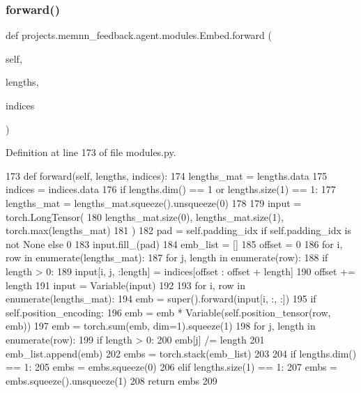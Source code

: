 \subsubsection{\texorpdfstring{forward()}{forward()}}
{\footnotesize\ttfamily def projects.\+memnn\+\_\+feedback.\+agent.\+modules.\+Embed.\+forward (\begin{DoxyParamCaption}\item[{}]{self,  }\item[{}]{lengths,  }\item[{}]{indices }\end{DoxyParamCaption})}



Definition at line 173 of file modules.\+py.


\begin{DoxyCode}
173     \textcolor{keyword}{def }forward(self, lengths, indices):
174         lengths\_mat = lengths.data
175         indices = indices.data
176         \textcolor{keywordflow}{if} lengths.dim() == 1 \textcolor{keywordflow}{or} lengths.size(1) == 1:
177             lengths\_mat = lengths\_mat.squeeze().unsqueeze(0)
178 
179         input = torch.LongTensor(
180             lengths\_mat.size(0), lengths\_mat.size(1), torch.max(lengths\_mat)
181         )
182         pad = self.padding\_idx \textcolor{keywordflow}{if} self.padding\_idx \textcolor{keywordflow}{is} \textcolor{keywordflow}{not} \textcolor{keywordtype}{None} \textcolor{keywordflow}{else} 0
183         input.fill\_(pad)
184         emb\_list = []
185         offset = 0
186         \textcolor{keywordflow}{for} i, row \textcolor{keywordflow}{in} enumerate(lengths\_mat):
187             \textcolor{keywordflow}{for} j, length \textcolor{keywordflow}{in} enumerate(row):
188                 \textcolor{keywordflow}{if} length > 0:
189                     input[i, j, :length] = indices[offset : offset + length]
190                 offset += length
191         input = Variable(input)
192 
193         \textcolor{keywordflow}{for} i, row \textcolor{keywordflow}{in} enumerate(lengths\_mat):
194             emb = super().forward(input[i, :, :])
195             \textcolor{keywordflow}{if} self.position\_encoding:
196                 emb = emb * Variable(self.position\_tensor(row, emb))
197             emb = torch.sum(emb, dim=1).squeeze(1)
198             \textcolor{keywordflow}{for} j, length \textcolor{keywordflow}{in} enumerate(row):
199                 \textcolor{keywordflow}{if} length > 0:
200                     emb[j] /= length
201             emb\_list.append(emb)
202         embs = torch.stack(emb\_list)
203 
204         \textcolor{keywordflow}{if} lengths.dim() == 1:
205             embs = embs.squeeze(0)
206         \textcolor{keywordflow}{elif} lengths.size(1) == 1:
207             embs = embs.squeeze().unsqueeze(1)
208         \textcolor{keywordflow}{return} embs
209 
\end{DoxyCode}
